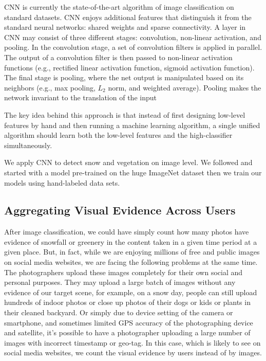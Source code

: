 CNN is currently the state-of-the-art algorithm of image classification on standard datasets.
CNN enjoys additional features that distinguish it from the standard neural networks: 
shared weights and sparse connectivity.
A layer in CNN may consist of three different stages: 
convolution, non-linear activation, and pooling.
In the convolution stage, a set of convolution filters is applied in parallel. 
The output of a convolution filter is then passed to non-linear activation functions 
(e.g., rectified linear activation function, sigmoid activation function).
The final stage is pooling, where the net output is manipulated based on its neighbors 
(e.g., max pooling, $L_2$ norm, and weighted average).
Pooling makes the network invariant to the translation of the input

The key idea behind this approach is that instead of first designing low-level features by
hand and then running a machine learning algorithm, a single unified
algorithm should learn both the low-level features and the
high-classifier simultaneously. 

We apply CNN to detect snow and vegetation on image level. 
We followed  and started with a model pre-trained on the huge 
ImageNet dataset then we train our models using hand-labeled data sets.

\subsection{Aggregating Visual Evidence Across Users}
\label{model}
After image classification, we could have simply count how many photos have evidence of snowfall 
or greenery in the content taken in a given time period at a given place. But, in fact, while we are 
enjoying millions of free and public images on social media websites, we are facing the following problems 
at the same time. The photographers upload these images completely for their own social and personal purposes. 
They may upload a large batch of images without any evidence of our target scene, for example, 
on a snow 
day, people can still upload hundreds of indoor photos or close up photos of their dogs or kids or plants 
in their cleaned backyard. 
Or simply due to device setting of the camera or smartphone, and sometimes limited GPS accuracy of the photographing 
device and satellite, it's possible 
to have a photographer uploading a large number of images with incorrect timestamp or geo-tag.
In this case, which is likely to see on social media websites, we count the visual evidence 
by users instead of by images.

